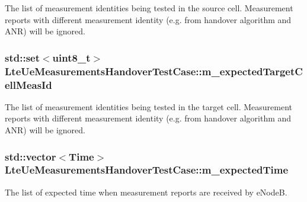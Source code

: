 The list of measurement identities being tested in the source cell. Measurement reports with different measurement identity (e.\+g. from handover algorithm and A\+NR) will be ignored. 

\subsubsection[{\texorpdfstring{m\+\_\+expected\+Target\+Cell\+Meas\+Id}{m_expectedTargetCellMeasId}}]{\setlength{\rightskip}{0pt plus 5cm}std\+::set$<$uint8\+\_\+t$>$ Lte\+Ue\+Measurements\+Handover\+Test\+Case\+::m\+\_\+expected\+Target\+Cell\+Meas\+Id\hspace{0.3cm}{\ttfamily [private]}}\hypertarget{classLteUeMeasurementsHandoverTestCase_a63388a20a3de7adc15907242f6e4a8bf}{}\label{classLteUeMeasurementsHandoverTestCase_a63388a20a3de7adc15907242f6e4a8bf}


The list of measurement identities being tested in the target cell. Measurement reports with different measurement identity (e.\+g. from handover algorithm and A\+NR) will be ignored. 

\subsubsection[{\texorpdfstring{m\+\_\+expected\+Time}{m_expectedTime}}]{\setlength{\rightskip}{0pt plus 5cm}std\+::vector$<${\bf Time}$>$ Lte\+Ue\+Measurements\+Handover\+Test\+Case\+::m\+\_\+expected\+Time\hspace{0.3cm}{\ttfamily [private]}}\hypertarget{classLteUeMeasurementsHandoverTestCase_a3d9400d416e518e007955fff996b602d}{}\label{classLteUeMeasurementsHandoverTestCase_a3d9400d416e518e007955fff996b602d}


The list of expected time when measurement reports are received by e\+NodeB. 


